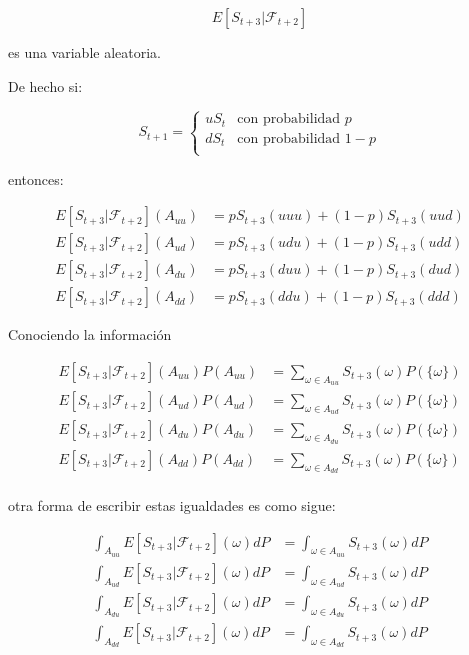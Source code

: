 \documentclass{extreport}
\theoremstyle{definicion}
\theoremstyle{propiedad}
\begin{document}
$$
E\left[S_{t+3}\vert \mathcal{F}_{t+2}\right]
$$

es una variable aleatoria.

De hecho si:

$$
S_{t+1} =\begin{cases}
uS_t & \text{con probabilidad }p\\
dS_t & \text{con probabilidad }1-p\\
\end{cases}
$$

entonces:


\begin{align*}
E\left[S_{t+3}\vert \mathcal{F}_{t+2}\right](A_{uu}) & = p S_{t+3}(uuu) + (1-p)S_{t+3}(uud)\\
E\left[S_{t+3}\vert \mathcal{F}_{t+2}\right](A_{ud}) & = p S_{t+3}(udu) + (1-p)S_{t+3}(udd)\\
E\left[S_{t+3}\vert \mathcal{F}_{t+2}\right](A_{du}) & = p S_{t+3}(duu) + (1-p)S_{t+3}(dud)\\
E\left[S_{t+3}\vert \mathcal{F}_{t+2}\right](A_{dd}) & = p S_{t+3}(ddu) + (1-p)S_{t+3}(ddd)
\end{align*}


Conociendo la información


\begin{align*}
E\left[S_{t+3}\vert \mathcal{F}_{t+2}\right](A_{uu})P(A_{uu}) & = \sum_{\omega \in A_{uu}}S_{t+3}(\omega)P(\{\omega\})\\
E\left[S_{t+3}\vert \mathcal{F}_{t+2}\right](A_{ud})P(A_{ud}) & = \sum_{\omega \in A_{ud}}S_{t+3}(\omega)P(\{\omega\})\\
E\left[S_{t+3}\vert \mathcal{F}_{t+2}\right](A_{du})P(A_{du}) & = \sum_{\omega \in A_{du}}S_{t+3}(\omega)P(\{\omega\})\\
E\left[S_{t+3}\vert \mathcal{F}_{t+2}\right](A_{dd})P(A_{dd}) & = \sum_{\omega \in A_{dd}}S_{t+3}(\omega)P(\{\omega\})\\
\end{align*}


otra forma de escribir estas igualdades es como sigue:


\begin{align*}
\int_{A_{uu}}E\left[S_{t+3}\vert \mathcal{F}_{t+2}\right](\omega)dP & = \int_{\omega \in A_{uu}}S_{t+3}(\omega)dP\\
\int_{A_{ud}}E\left[S_{t+3}\vert \mathcal{F}_{t+2}\right](\omega)dP & = \int_{\omega \in A_{ud}}S_{t+3}(\omega)dP\\
\int_{A_{du}}E\left[S_{t+3}\vert \mathcal{F}_{t+2}\right](\omega)dP & = \int_{\omega \in A_{du}}S_{t+3}(\omega)dP\\
\int_{A_{dd}}E\left[S_{t+3}\vert \mathcal{F}_{t+2}\right](\omega)dP & = \int_{\omega \in A_{dd}}S_{t+3}(\omega)dP\\
\end{align*}
\end{document}
